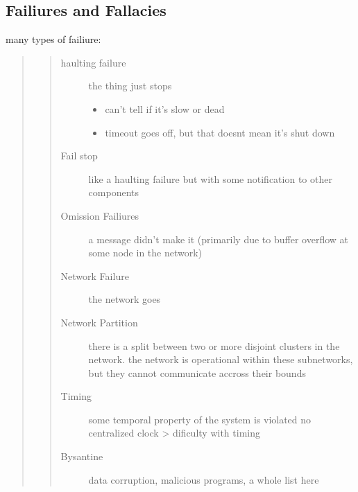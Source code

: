 \documentclass[letterpaper,10pt,english]{sphinxmanual}
\begin{document}
\subsection{Failiures and Fallacies}
\label{\detokenize{google_article:failiures-and-fallacies}}
many types of failiure:
\begin{quote}
\begin{quote}\begin{description}
\item[{haulting failure}] \leavevmode
the thing just stops
\begin{itemize}
\item {} 
can’t tell if it’s slow or dead

\item {} 
timeout goes off, but that doesnt mean it’s shut down

\end{itemize}

\item[{Fail stop}] \leavevmode
like a haulting failure but with some notification
to other components

\item[{Omission Failiures}] \leavevmode
a message didn’t make it (primarily due to buffer overflow
at some node in the network)

\item[{Network Failure}] \leavevmode
the network goes

\item[{Network Partition}] \leavevmode
there is a split between two or more disjoint
clusters in the network. the network is operational within these
sub\sphinxhyphen{}networks, but they cannot communicate accross their bounds

\item[{Timing}] \leavevmode
some temporal property of the system is violated
no centralized clock \textendash{}\textgreater{} dificulty with timing

\item[{Bysantine}] \leavevmode
data corruption, malicious programs, a whole list here

\end{description}\end{quote}
\end{quote}
\end{document}
